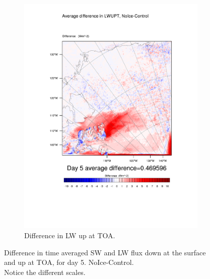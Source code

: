 \begin{figure}
\begin{subfigure}{0.48\textwidth}
		\includegraphics[width=\textwidth]{results/noice/diff_NoIce_LWUPT_Day5.pdf}
		\caption{Difference in LW up at TOA.}
		\label{subfig:lwup_r2Day5}
	\end{subfigure}
	\caption{Difference in time averaged SW and LW flux down at the surface and up at TOA, for day 5. NoIce-Control.\\Notice the different scales.}
	\label{fig:radiation_r2Day5}
\end{figure}

